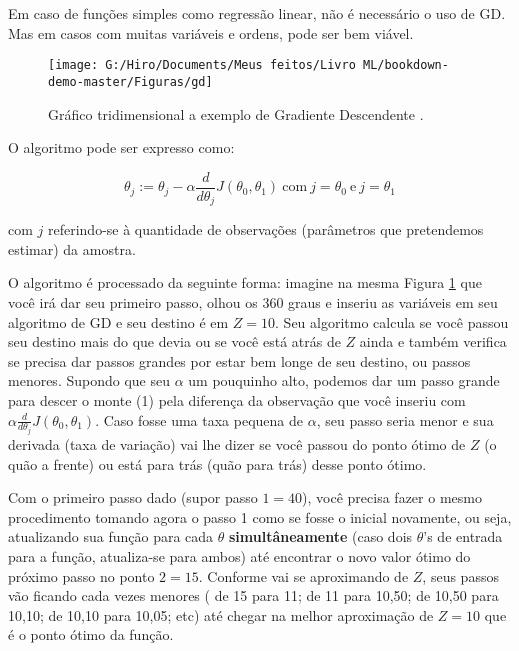\documentclass[
]{book}
\begin{document}
Em caso de funções simples como regressão linear, não é necessário o uso de GD. Mas em casos com muitas variáveis e ordens, pode ser bem viável.

\begin{figure}

{\centering \texttt{[image: G:/Hiro/Documents/Meus feitos/Livro ML/bookdown-demo-master/Figuras/gd]} 

}

\caption{Gráfico tridimensional a exemplo de Gradiente Descendente \citep{andrewcoursera}.}\label{fig:gd}
\end{figure}



O algoritmo pode ser expresso como:

\begin{equation}
    \theta_j := \theta_j - \alpha \frac{d}{d \theta_j}J(\theta_0,\theta_1) \ \mbox{com} \ j=\theta_0 \ \mbox{e} \ j=\theta_1 
    \label{eq:GD}
\end{equation}

com \(j\) referindo-se à quantidade de observações (parâmetros que pretendemos estimar) da amostra.

O algoritmo é processado da seguinte forma: imagine na mesma Figura \ref{fig:gd} que você irá dar seu primeiro passo, olhou os 360 graus e inseriu as variáveis em seu algoritmo de GD e seu destino é em \(Z=10\). Seu algoritmo calcula se você passou seu destino mais do que devia ou se você está atrás de \(Z\) ainda e também verifica se precisa dar passos grandes por estar bem longe de seu destino, ou passos menores. Supondo que seu \(\alpha\) um pouquinho alto, podemos dar um passo grande para descer o monte (1) pela diferença da observação que você inseriu com \(\alpha \frac{d}{d \theta_j}J(\theta_0,\theta_1)\). Caso fosse uma taxa pequena de \(\alpha\), seu passo seria menor e sua derivada (taxa de variação) vai lhe dizer se você passou do ponto ótimo de \(Z\) (o quão a frente) ou está para trás (quão para trás) desse ponto ótimo.

Com o primeiro passo dado (supor passo \(1 = 40\)), você precisa fazer o mesmo procedimento tomando agora o passo 1 como se fosse o inicial novamente, ou seja, atualizando sua função para cada \(\theta\) \textbf{simultâneamente} (caso dois \(\theta\)'s de entrada para a função, atualiza-se para ambos) até encontrar o novo valor ótimo do próximo passo no ponto \(2=15\). Conforme vai se aproximando de \(Z\), seus passos vão ficando cada vezes menores ( de 15 para 11; de 11 para 10,50; de 10,50 para 10,10; de 10,10 para 10,05; etc) até chegar na melhor aproximação de \(Z=10\) que é o ponto ótimo da função.
\end{document}
